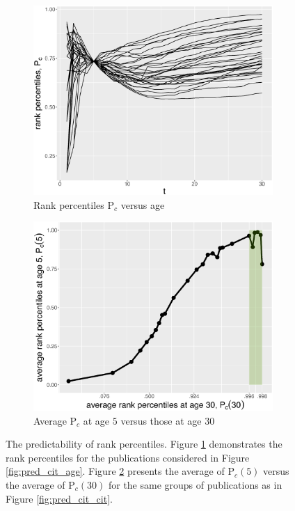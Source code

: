 \begin{figure}[ht!]
    \centering
    \begin{subfigure}[b]{0.495\textwidth}
     \centering
     \includegraphics[width=\textwidth]{figures/pred_power/rp_t.eps}
     \caption{Rank percentiles P$_c$ versus age}
     \label{fig:pred_rp_age}
    \end{subfigure}
    \hfill
    \begin{subfigure}[b]{0.495\textwidth}
     \centering
     \includegraphics[width=\textwidth]{figures/pred_power/rp_rp.eps}
     \caption{Average P$_c$ at age $5$ versus those at age $30$}
     \label{fig:pred_rp_rp}
    \end{subfigure}
    \caption[Predictability of rank percentiles]{The predictability of rank percentiles. Figure \ref{fig:pred_rp_age} demonstrates the rank percentiles for the publications considered in Figure \ref{fig:pred_cit_age}. Figure \ref{fig:pred_rp_rp} presents the average of P$_c(5)$ versus the average of P$_c(30)$ for the same groups of publications as in Figure \ref{fig:pred_cit_cit}.}
    \label{fig:pub_rp_pred}
\end{figure}

